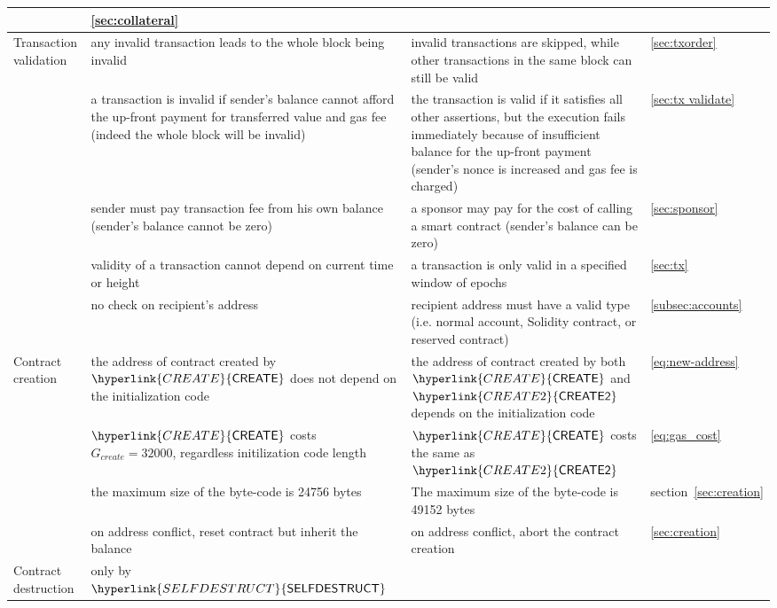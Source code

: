 \documentclass[fleqn,10pt]{SelfArx} %
\begin{document}
\begin{center}
\begin{tabu}{l X X l}
			& \cref{sec:collateral}\\
			\hline
			Transaction validation & 
			{any invalid transaction leads to the whole block being invalid} & 
			{invalid transactions are skipped, while other transactions in the same block can still be valid} & \cref{sec:txorder}\smallskip\\
			& {a transaction is invalid if sender's balance cannot afford the up-front payment for transferred value and gas fee (indeed the whole block will be invalid)} & {the transaction is valid if it satisfies all other assertions, but the execution fails immediately because of insufficient balance for the up-front payment (sender's nonce is increased and gas fee is charged)}	& \cref{sec:tx validate} \\
			& sender must pay transaction fee from his own balance (sender's balance cannot be zero)	& a sponsor may pay for the cost of calling a smart contract (sender's balance can be zero)	& \cref{sec:sponsor} \\
			& validity of a transaction cannot depend on current time or height & a transaction is only valid in a specified window of epochs & \cref{sec:tx} \\
			& no check on recipient's address & recipient address must have a valid type (i.e. normal account, Solidity contract, or reserved contract)  & \cref{subsec:accounts} \\
			\hline
			Contract creation & the address of contract created by $\hyperlink{CREATE}{\op{CREATE}}$ does not depend on the initialization code  &  the address of contract created by both $\hyperlink{CREATE}{\op{CREATE}}$ and $\hyperlink{CREATE2}{\op{CREATE2}}$ depends on the initialization code &  \cref{eq:new-address} \\
			 & 
			$\hyperlink{CREATE}{\op{CREATE}}$ costs $G_{create}=32000$, regardless initilization code length	
			& $\hyperlink{CREATE}{\op{CREATE}}$ costs the same as $\hyperlink{CREATE2}{\op{CREATE2}}$  & \cref{eq:gas_cost} \\
			& the maximum size of the byte-code is 24756 bytes & The maximum size of the byte-code is 49152 bytes & section~\ref{sec:creation}\\
			& on address conflict, reset contract but inherit the balance &  
			on address conflict, abort the contract creation   
			& \cref{sec:creation}  \smallskip\\
			\hline
			Contract destruction & only by $\hyperlink{SELFDESTRUCT}{\op{SELFDESTRUCT}}$ & 

\end{tabu}
\end{center}
\end{document}

